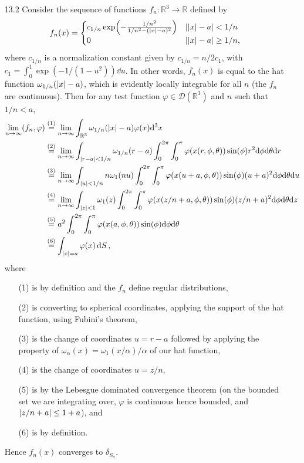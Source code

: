 \documentclass[11pt]{article}
\newcommand{\eq}[1]{\overset{(#1)}{=}}
\begin{document}
\begin{enumerate}
    \item[13.2] Consider the sequence of functions $f_n\colon\mathbb{R}^3\to\mathbb{R}$ defined by \[f_n(x) = \begin{cases}
        c_{1/n}\exp(-\frac{1/n^2}{1/n^2- (\abs{x}-a)^2}) & \abs{\abs{x}-a}<1/n\\
        0 & \abs{\abs{x}-a}\geq 1/n,
    \end{cases}\] where $c_{1/n}$ is a normalization constant given by $c_{1/n} = n/2c_1$, with $c_1 = \int_0^1\exp(-1/(1-u^2))\dd{u}$. In other words, $f_n(x)$ is equal to the hat function $\omega_{1/n}(\abs{x}-a)$, which is evidently locally integrable for all $n$ (the $f_n$ are continuous). Then for any test function $\varphi\in \mathcal{D}(\mathbb{R}^3)$ and $n$ such that $1/n<a$,
    \begin{align*}
        \lim_{n\to\infty} (f_n,\varphi) &\eq{1} \lim_{n\to\infty}\int_{\mathbb{R}^3}\omega_{1/n}(\abs{x}-a)\varphi(x)\dd[3]x\\
        &\eq{2} \lim_{n\to\infty}\int_{\abs{r-a}<1/n}\omega_{1/n}(r-a)\int_0^{2\pi}\int_0^\pi\varphi(x(r,\phi,\theta))\sin(\phi)r^2 \dd\phi \dd\theta \dd r\\
        &\eq{3} \lim_{n\to\infty}\int_{\abs{u}<1/n}n\omega_{1}(nu)\int_0^{2\pi}\int_0^\pi\varphi(x(u+a,\phi,\theta))\sin(\phi)(u+a)^2 \dd\phi \dd\theta \dd u\\
        &\eq{4} \lim_{n\to\infty}\int_{\abs{z}<1}\omega_{1}(z)\int_0^{2\pi}\int_0^\pi\varphi(x(z/n+a,\phi,\theta))\sin(\phi)(z/n+a)^2 \dd\phi \dd\theta \dd z\\
        &\eq{5} a^2\int_0^{2\pi}\int_0^\pi\varphi(x(a,\phi,\theta))\sin(\phi) \dd\phi \dd\theta\\
        &\eq{6} \int_{\abs{x}=a}\varphi(x)\dd{S},
    \end{align*}where \begin{enumerate}
        \item[(1)] is by definition and the $f_n$ define regular distributions,
        \item[(2)] is converting to spherical coordinates, applying the support of the hat function, using Fubini's theorem,
        \item[(3)] is the change of coordinates $u = r-a$ followed by applying the property of $\omega_\alpha(x) = \omega_1(x/\alpha)/\alpha$ of our hat function,
        \item[(4)] is the change of coordinates $u = z/n$,
        \item[(5)] is by the Lebesgue dominated convergence theorem (on the bounded set we are integrating over, $\varphi$ is continuous hence bounded, and $\abs{z/n+a}\leq 1+a$), and
        \item[(6)] is by definition.
    \end{enumerate} Hence $f_n(x)$ converges to $\delta_{S_a}$.


\end{enumerate}
\end{document}
